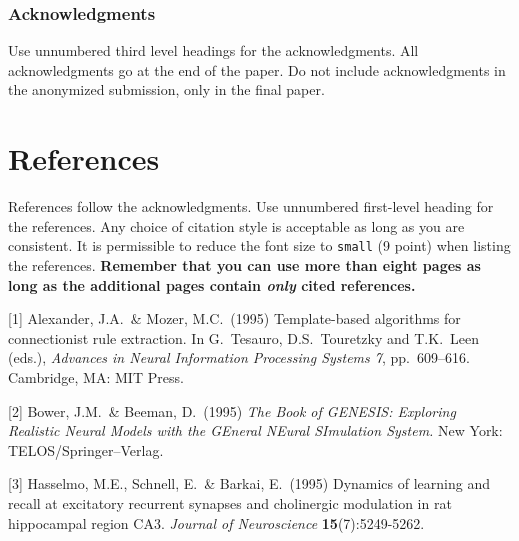 \documentclass{article}
\begin{document}
\subsubsection*{Acknowledgments}

Use unnumbered third level headings for the acknowledgments. All acknowledgments
go at the end of the paper. Do not include acknowledgments in the anonymized
submission, only in the final paper.

\section*{References}

References follow the acknowledgments. Use unnumbered first-level heading for
the references. Any choice of citation style is acceptable as long as you are
consistent. It is permissible to reduce the font size to \verb+small+ (9 point)
when listing the references. {\bf Remember that you can use more than eight
  pages as long as the additional pages contain \emph{only} cited references.}
\medskip

\small

[1] Alexander, J.A.\ \& Mozer, M.C.\ (1995) Template-based algorithms for
connectionist rule extraction. In G.\ Tesauro, D.S.\ Touretzky and T.K.\ Leen
(eds.), {\it Advances in Neural Information Processing Systems 7},
pp.\ 609--616. Cambridge, MA: MIT Press.

[2] Bower, J.M.\ \& Beeman, D.\ (1995) {\it The Book of GENESIS: Exploring
  Realistic Neural Models with the GEneral NEural SImulation System.}  New York:
TELOS/Springer--Verlag.

[3] Hasselmo, M.E., Schnell, E.\ \& Barkai, E.\ (1995) Dynamics of learning and
recall at excitatory recurrent synapses and cholinergic modulation in rat
hippocampal region CA3. {\it Journal of Neuroscience} {\bf 15}(7):5249-5262.
\end{document}
